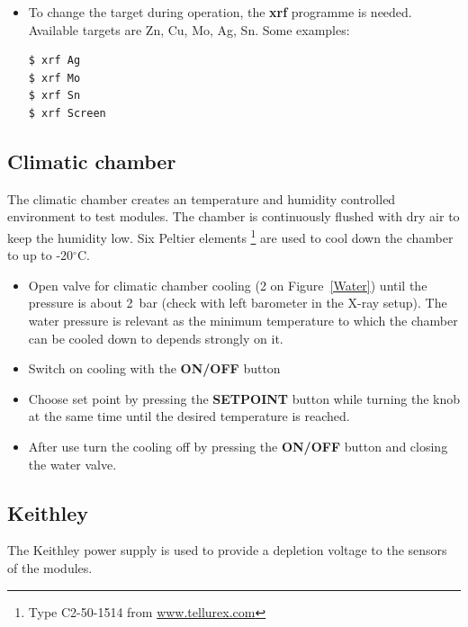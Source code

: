 \documentclass[a4paper,12pt,twoside]{article}
\begin{document}
\begin{itemize}
\item {To change the target during operation, the \textbf{xrf} programme is needed.  Available targets are Zn, Cu, Mo, Ag, Sn. Some examples:
\begin{Verbatim}[frame=single]
$ xrf Ag
$ xrf Mo
$ xrf Sn
$ xrf Screen
\end{Verbatim}
}
\end{itemize}

\subsection{Climatic chamber}

The climatic chamber creates an temperature and humidity controlled environment to test modules. The chamber is continuously flushed with dry air to keep the humidity low. Six Peltier elements \footnote{Type C2-50-1514 from \url{www.tellurex.com}} are used to cool down the chamber to up to -20$^\circ$C.

\begin{itemize}
\item Open valve for climatic chamber cooling (2 on Figure~\ref{Water}) until the pressure is about \SI{2}{\bar} (check with left barometer in the X-ray setup). The water pressure is relevant as the minimum temperature to which the chamber can be cooled down to depends strongly on it. 
\item Switch on cooling with the \textbf{ON/OFF} button
\item Choose set point by pressing the \textbf{SETPOINT} button while turning the knob at the same time until the desired temperature is reached.
\item After use turn the cooling off by pressing the \textbf{ON/OFF} button and closing the water valve.
\end{itemize}

\subsection{Keithley}
The Keithley power supply is used to provide a depletion voltage to the sensors of the modules. 
\end{document}
